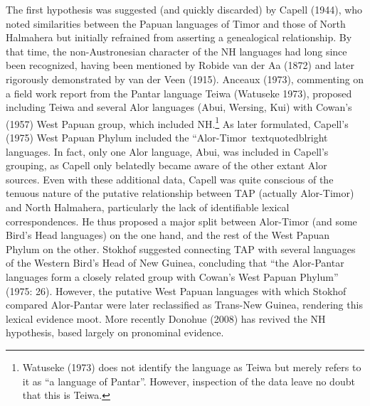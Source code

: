 The first hypothesis was suggested (and quickly discarded) by Capell (1944), who noted similarities between the Papuan languages of Timor and those of North Halmahera but initially refrained from asserting a genealogical relationship. By that time, the non-Austronesian character of the NH languages had long since been recognized, having been mentioned by Robide van der Aa (1872) and later rigorously demonstrated by van der Veen (1915). Anceaux (1973), commenting on a field work report from the Pantar language Teiwa (Watuseke 1973), proposed including Teiwa and several Alor languages (Abui, Wersing, Kui) with Cowan{\textquoteright}s (1957) West Papuan group, which included NH.\footnote{ Watuseke (1973) does not identify the language as Teiwa but merely refers to it as {\textquotedblleft}a language of Pantar{\textquotedblright}. However, inspection of the data leave no doubt that this is Teiwa.} As later formulated, Capell{\textquoteright}s (1975) West Papuan Phylum included the {\textquotedblleft}Alor-Timor{\
textquotedblright} languages. In fact, only one Alor language, Abui, was included in Capell{\textquoteright}s grouping, as Capell only belatedly became aware of the other extant Alor sources. Even with these additional data, Capell was quite conscious of the tenuous nature of the putative relationship between TAP (actually Alor-Timor) and North Halmahera, particularly the lack of identifiable lexical correspondences. He thus proposed a major split between Alor-Timor (and some Bird{\textquoteright}s Head languages) on the one hand, and the rest of the West Papuan Phylum on the other. Stokhof suggested connecting TAP with several languages of the Western Bird{\textquoteright}s Head of New Guinea, concluding that {\textquotedblleft}the Alor-Pantar languages form a closely related group with Cowan{\textquoteright}s West Papuan Phylum{\textquotedblright} (1975: 26). However, the putative West Papuan languages with which Stokhof compared Alor-Pantar were later reclassified as Trans-New Guinea, rendering this 
lexical evidence moot. More recently Donohue (2008) has revived the NH hypothesis, based largely on pronominal evidence. 

